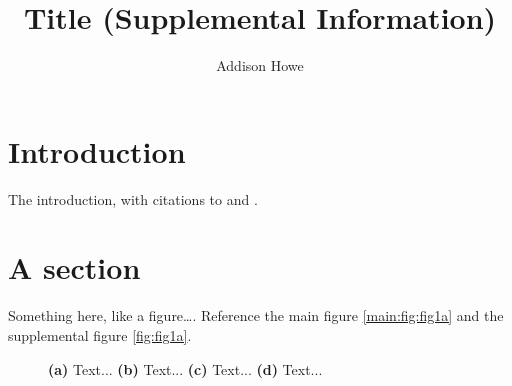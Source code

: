 \documentclass{article}
\title{Title (Supplemental Information)}
\author{Addison Howe}
\date{}
\begin{document}
\maketitle
\tableofcontents


\section{Introduction} \label{introduction}

The introduction, with citations to \citep{placeholder-ref1} and \citeauthor{placeholder-ref2}.

\section{A section}

Something here, like a figure\dots.
Reference the main figure \ref{main:fig:fig1a} and the supplemental figure \ref{fig:fig1a}.

\begin{figure}
    \centering

    
    \caption{%
        \textbf{(a)} 
        Text...
        \textbf{(b)} 
        Text...
        \textbf{(c)} 
        Text...
        \textbf{(d)} 
        Text...
    }
    \label{fig:fig1}
\end{figure}




\newpage
\printbibliography
\end{document}
